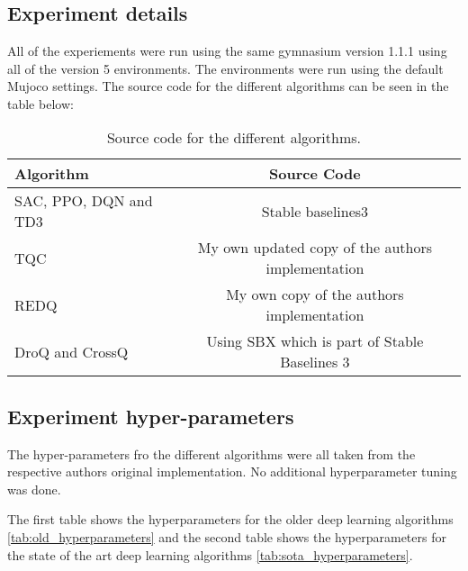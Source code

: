 \chapter{}\label{C:appendixA}

\section{Experiment details}

All of the experiements were run using the same gymnasium version 1.1.1 using all of the version 5 environments. The environments were run using the default Mujoco settings. The source code for the different algorithms can be seen in the table below:

\begin{table}[H]
\centering
\caption{Source code for the different algorithms.}
\label{tab:sourcecode}
\begin{tabular}{l|c}
\toprule
\textbf{Algorithm}                & \textbf{Source Code}             \\
\midrule\midrule
SAC, PPO, DQN and TD3 & Stable baselines3 \cite{stable-baselines3} \\

TQC & My own updated copy of the authors implementation \cite{thompson1jamesthompson1Tqc_pytorch2025} \cite{SamsungLabsTqc_pytorchImplementation} \\
REDQ & My own copy of the authors implementation \cite{thompson1jamesthompson1REDQ2025} \cite{watchernyuWatchernyuREDQ2025} \\
DroQ and CrossQ & Using SBX which is part of Stable Baselines 3 \cite{stable-baselines3} \\

\bottomrule
\end{tabular}
\end{table}

\section{Experiment hyper-parameters}

The hyper-parameters fro the different algorithms were all taken from the respective authors original implementation. No additional hyperparameter tuning was done.

The first table shows the hyperparameters for the older deep learning algorithms \ref{tab:old_hyperparameters} and the second table shows the hyperparameters for the state of the art deep learning algorithms \ref{tab:sota_hyperparameters}.


